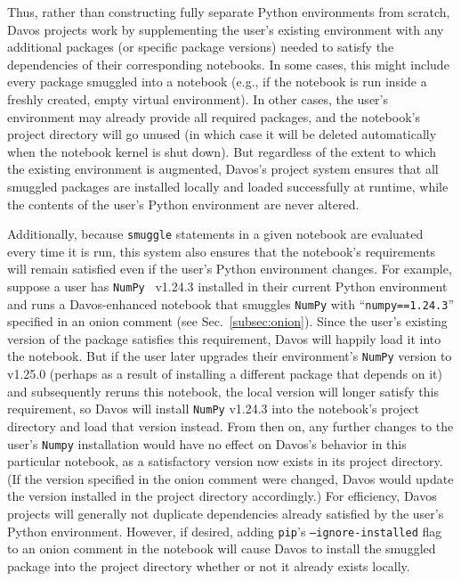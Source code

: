 \documentclass[preprint,12pt,a4paper]{elsarticle}
\begin{document}
Thus, rather than constructing fully separate Python environments from scratch,
Davos projects work by supplementing the user's existing environment with any additional packages (or specific package versions) needed to satisfy the dependencies of their corresponding notebooks.
In some cases, this might include every package smuggled into a notebook (e.g., if the notebook is run inside a freshly created, empty virtual environment).
In other cases, the user's environment may already provide all required packages, and the notebook's project directory will go unused (in which case it will be deleted automatically when the notebook kernel is shut down).
But regardless of the extent to which the existing environment is augmented, Davos's project system ensures that all smuggled packages are installed locally and loaded successfully at runtime, while the contents of the user's Python environment are never altered.

Additionally, because \texttt{smuggle} statements in a given notebook are evaluated every time it is run, this system also ensures that the notebook's requirements will remain satisfied even if the user's Python environment changes.
For example, suppose a user has \texttt{NumPy}~\cite{HarrEtal20} v1.24.3 installed in their current Python environment and runs a Davos-enhanced notebook that smuggles \texttt{NumPy} with ``\texttt{numpy==1.24.3}'' specified in an onion comment (see Sec.~\ref{subsec:onion}).
Since the user's existing version of the package satisfies this requirement, Davos will happily load it into the notebook.
But if the user later upgrades their environment's \texttt{NumPy} version to v1.25.0 (perhaps as a result of installing a different package that depends on it) and subsequently reruns this notebook, the local version will longer satisfy this requirement, so Davos will install \texttt{NumPy} v1.24.3 into the notebook's project directory and load that version instead.
From then on, any further changes to the user's \texttt{Numpy} installation would have no effect on Davos's behavior in this particular notebook, as a satisfactory version now exists in its project directory.
(If the version specified in the onion comment were changed, Davos would update the version installed in the project directory accordingly.)
For efficiency, Davos projects will generally not duplicate dependencies already satisfied by the user's Python environment.
However, if desired, adding \texttt{pip}'s \texttt{--ignore-installed} flag to an onion comment in the notebook will cause Davos to install the smuggled package into the project directory whether or not it already exists locally.
\end{document}

